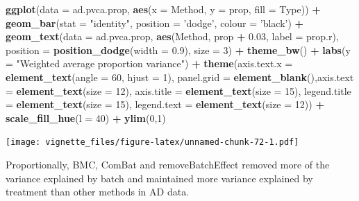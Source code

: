 \documentclass[]{book}
\newenvironment{Shaded}{\begin{snugshade}}{\end{snugshade}}
\newcommand{\KeywordTok}[1]{\textcolor[rgb]{0.13,0.29,0.53}{\textbf{#1}}}
\newcommand{\DataTypeTok}[1]{\textcolor[rgb]{0.13,0.29,0.53}{#1}}
\newcommand{\DecValTok}[1]{\textcolor[rgb]{0.00,0.00,0.81}{#1}}
\newcommand{\FloatTok}[1]{\textcolor[rgb]{0.00,0.00,0.81}{#1}}
\newcommand{\StringTok}[1]{\textcolor[rgb]{0.31,0.60,0.02}{#1}}
\newcommand{\OperatorTok}[1]{\textcolor[rgb]{0.81,0.36,0.00}{\textbf{#1}}}
\newcommand{\NormalTok}[1]{#1}
\begin{document}
\begin{Shaded}
\begin{Highlighting}[]
\KeywordTok{ggplot}\NormalTok{(}\DataTypeTok{data =}\NormalTok{ ad.pvca.prop, }\KeywordTok{aes}\NormalTok{(}\DataTypeTok{x =}\NormalTok{ Method, }\DataTypeTok{y =}\NormalTok{ prop, }\DataTypeTok{fill =}\NormalTok{ Type)) }\OperatorTok{+}\StringTok{ }
\StringTok{  }\KeywordTok{geom_bar}\NormalTok{(}\DataTypeTok{stat =} \StringTok{"identity"}\NormalTok{, }\DataTypeTok{position =} \StringTok{'dodge'}\NormalTok{, }\DataTypeTok{colour =} \StringTok{'black'}\NormalTok{) }\OperatorTok{+}\StringTok{ }
\StringTok{  }\KeywordTok{geom_text}\NormalTok{(}\DataTypeTok{data =}\NormalTok{ ad.pvca.prop, }\KeywordTok{aes}\NormalTok{(Method, prop }\OperatorTok{+}\StringTok{ }\FloatTok{0.03}\NormalTok{, }\DataTypeTok{label =}\NormalTok{ prop.r), }
            \DataTypeTok{position =} \KeywordTok{position_dodge}\NormalTok{(}\DataTypeTok{width =} \FloatTok{0.9}\NormalTok{), }\DataTypeTok{size =} \DecValTok{3}\NormalTok{) }\OperatorTok{+}\StringTok{ }\KeywordTok{theme_bw}\NormalTok{() }\OperatorTok{+}\StringTok{ }
\StringTok{  }\KeywordTok{labs}\NormalTok{(}\DataTypeTok{y =} \StringTok{"Weighted average proportion variance"}\NormalTok{) }\OperatorTok{+}\StringTok{ }
\StringTok{  }\KeywordTok{theme}\NormalTok{(}\DataTypeTok{axis.text.x =} \KeywordTok{element_text}\NormalTok{(}\DataTypeTok{angle =} \DecValTok{60}\NormalTok{, }\DataTypeTok{hjust =} \DecValTok{1}\NormalTok{), }
        \DataTypeTok{panel.grid =} \KeywordTok{element_blank}\NormalTok{(),}\DataTypeTok{axis.text =} \KeywordTok{element_text}\NormalTok{(}\DataTypeTok{size =} \DecValTok{12}\NormalTok{), }
        \DataTypeTok{axis.title =} \KeywordTok{element_text}\NormalTok{(}\DataTypeTok{size =} \DecValTok{15}\NormalTok{), }\DataTypeTok{legend.title =} \KeywordTok{element_text}\NormalTok{(}\DataTypeTok{size =} \DecValTok{15}\NormalTok{), }
        \DataTypeTok{legend.text =} \KeywordTok{element_text}\NormalTok{(}\DataTypeTok{size =} \DecValTok{12}\NormalTok{)) }\OperatorTok{+}\StringTok{ }\KeywordTok{scale_fill_hue}\NormalTok{(}\DataTypeTok{l =} \DecValTok{40}\NormalTok{) }\OperatorTok{+}\StringTok{ }\KeywordTok{ylim}\NormalTok{(}\DecValTok{0}\NormalTok{,}\DecValTok{1}\NormalTok{)}
\end{Highlighting}
\end{Shaded}

\texttt{[image: vignette\_files/figure-latex/unnamed-chunk-72-1.pdf]}

Proportionally, BMC, ComBat and removeBatchEffect removed more of the
variance explained by batch and maintained more variance explained by
treatment than other methods in AD data.
\end{document}

